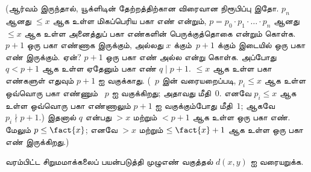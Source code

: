 \documentclass[../../../include/open-logic-section]{subfiles}
\begin{document}
(ஆர்வம் இருந்தால், யூக்ளிடின் தேற்றத்திற்கான விரைவான நிரூபிப்பு இதோ.
$p_n$ ஆனது $\le x$ ஆக உள்ள மிகப்பெரிய பகா எண் என்றும்,
$p = p_0\cdot p_1 \cdot \dots \cdot p_n$ ஆனது~$\le x$ ஆக உள்ள
அனைத்துப் பகா எண்களின் பெருக்குத்தொகை என்றும் கொள்க. $p+1$ ஒரு
பகா எண்ணாக இருக்கும், அல்லது $x$ க்கும்~$p+1$ க்கும் இடையில்
ஒரு பகா எண் இருக்கும். ஏன்? $p+1$ ஒரு பகா எண் அல்ல என்று கொள்க.
அப்போது $q < p+1$ ஆக உள்ள ஏதேனும் பகா எண் $q \mid p+1$.
$\le x$ ஆக உள்ள பகா எண்களுள் எதுவும் $p+1$ ஐ வகுக்காது.
(~$p$ இன் வரையறைப்படி, $p_i \le x$ ஆக உள்ள ஒவ்வொரு பகா எண்ணும்
~$p$ ஐ வகுக்கிறது; அதாவது மீதி~$0$. எனவே $p_i \le x$ ஆக உள்ள
ஒவ்வொரு பகா எண்ணாலும் $p+1$ ஐ வகுக்கும்போது மீதி~$1$; ஆகவே
$p_i \nmid p+1$.) இதனால் $q$ என்பது $> x$ மற்றும் $< p+1$
ஆக உள்ள ஒரு பகா எண். மேலும் $p \le \fact{x}$; எனவே $> x$ மற்றும்
$\le \fact{x}+1$ ஆக உள்ள ஒரு பகா எண் இருக்கிறது.)

\begin{prob}
வரம்பிட்ட சிறுமமாக்கலைப் பயன்படுத்தி முழுஎண் வகுத்தல் $d(x, y)$ ஐ
வரையறுக்க.
\end{prob}
\end{document}
